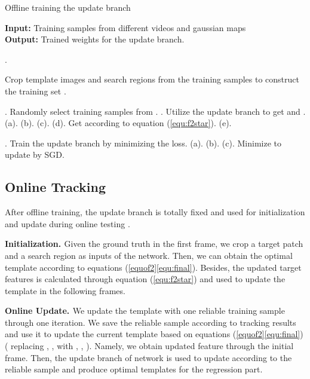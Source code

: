 \documentclass[10pt,twocolumn,letterpaper]{article}
\begin{document}
\begin{algorithm}[h]
	\caption{Offline training the update branch}
	\label{alg:offline}
	{\textbf{Input: }}Training samples  from different videos and gaussian maps \\
	{\textbf{Output: }}Trained weights  for the update branch.\\
	\begin{algorithmic}
	\vspace{-2mm}
		.
		
		\STATE Crop template images  and search regions  from the training samples to construct the training set  .
		
		. Randomly select  training samples from .
		. Utilize the update branch to get  and .
		\FOR{}
		\STATE (a). 
		\STATE (b). 
		\STATE (c). 
		\STATE (d). Get  according to equation (\ref{equ:f2star}).
		\STATE (e). 
		\ENDFOR
		
		. Train the update branch by minimizing the loss.
		\FOR{}
		\STATE (a). 
		\STATE (b). 
		\STATE (c). Minimize  to update  by SGD.
		\ENDFOR
		\ENDWHILE
	\end{algorithmic}
\end{algorithm}

\subsection{Online Tracking}\label{sec::tracking}
After offline training, the update branch is totally fixed and used for initialization and update during online testing .

\noindent
{{\bf{Initialization. }}}
Given the ground truth in the first frame, we crop a target patch  and
a search region  as inputs of the network.
Then, we can obtain the optimal template  according to equations (\ref{equof2}\ref{equ:final}).
Besides, the updated target features  is calculated through equation (\ref{equ:f2star}) and used to update the template in the following frames.

\noindent
{{\bf{Online Update. }}}
We update the template  with one reliable training sample through one iteration.
We save the reliable sample  according
to tracking results and use it to update the current template  based on equations (\ref{equof2}\ref{equ:final})
( replacing , ,  with , ,  ).
Namely, we obtain updated feature  through the initial frame. Then, the update branch of network is used to update  according to the reliable sample  and produce optimal templates  for the regression part.
\end{document}
